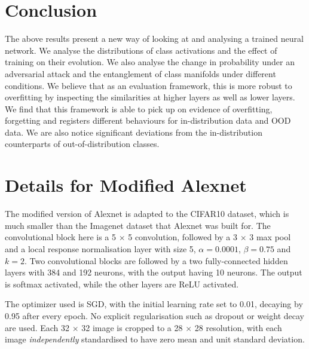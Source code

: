 \documentclass{article}
\begin{document}
        
    \section{Conclusion}
        The above results present a new way of looking at and analysing a trained neural network. We analyse the distributions of class activations and the effect of training on their evolution. We also analyse the change in probability under an adversarial attack and the entanglement of class manifolds under different conditions. We believe that as an evaluation framework, this is more robust to overfitting by inspecting the similarities at higher layers as well as lower layers. We find that this framework is able to pick up on evidence of overfitting, forgetting and registers different behaviours for in-distribution data and OOD data. We are also notice significant deviations from the in-distribution counterparts of out-of-distribution classes. 
    
    


    \appendix

    \section{Details for Modified Alexnet}
        The modified version of Alexnet is adapted to the CIFAR10 dataset, which is much smaller than the Imagenet dataset that Alexnet was built for. The convolutional block here is a 5 $\times$ 5 convolution, followed by a 3 $\times$ 3 max pool and a local response normalisation layer with size 5, $\alpha=0.0001$, $\beta=0.75$ and $k=2$. Two convolutional blocks are followed by a two fully-connected hidden layers with 384 and 192 neurons, with the output having 10 neurons. The output is softmax activated, while the other layers are ReLU activated.

        The optimizer used is SGD, with the initial learning rate set to 0.01, decaying by 0.95 after every epoch. No explicit regularisation such as dropout or weight decay are used. Each 32 $\times$ 32 image is cropped to a 28 $\times$ 28 resolution, with each image \textit{independently} standardised to have zero mean and unit standard deviation.

\end{document}
